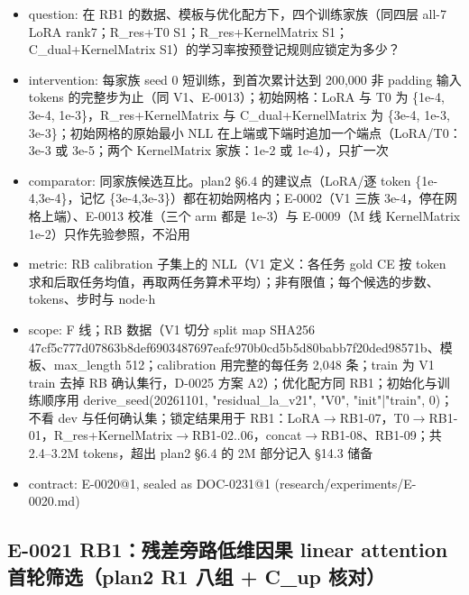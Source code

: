 \documentclass[11pt]{article}
\begin{document}
\begin{itemize}
\item question: 在 RB1 的数据、模板与优化配方下，四个训练家族（同四层 all-7 LoRA rank7；R\_res+T0 S1；R\_res+KernelMatrix S1；C\_dual+KernelMatrix S1）的学习率按预登记规则应锁定为多少？
\item intervention: 每家族 seed 0 短训练，到首次累计达到 200,000 非 padding 输入 tokens 的完整步为止（同 V1、E-0013）；初始网格：LoRA 与 T0 为 \{1e-4, 3e-4, 1e-3\}，R\_res+KernelMatrix 与 C\_dual+KernelMatrix 为 \{3e-4, 1e-3, 3e-3\}；初始网格的原始最小 NLL 在上端或下端时追加一个端点（LoRA/T0：3e-3 或 3e-5；两个 KernelMatrix 家族：1e-2 或 1e-4），只扩一次
\item comparator: 同家族候选互比。plan2 §6.4 的建议点（LoRA/逐 token \{1e-4,3e-4\}，记忆 \{3e-4,3e-3\}）都在初始网格内；E-0002（V1 三族 3e-4，停在网格上端）、E-0013 校准（三个 arm 都是 1e-3）与 E-0009（M 线 KernelMatrix 1e-2）只作先验参照，不沿用
\item metric: RB calibration 子集上的 NLL（V1 定义：各任务 gold CE 按 token 求和后取任务均值，再取两任务算术平均）；非有限值；每个候选的步数、tokens、步时与 node\ensuremath{\cdot}h
\item scope: F 线；RB 数据（V1 切分 split map SHA256 47cf5c777d07863b8def6903487697eafc970b0cd5b5d80babb7f20ded98571b、模板、max\_length 512；calibration 用完整的每任务 2,048 条；train 为 V1 train 去掉 RB 确认集行，D-0025 方案 A2）；优化配方同 RB1；初始化与训练顺序用 derive\_seed(20261101, "residual\_la\_v21", "V0", "init"|"train", 0)；不看 dev 与任何确认集；锁定结果用于 RB1：LoRA\ensuremath{\rightarrow}RB1-07，T0\ensuremath{\rightarrow}RB1-01，R\_res+KernelMatrix\ensuremath{\rightarrow}RB1-02..06，concat\ensuremath{\rightarrow}RB1-08、RB1-09；共 2.4--3.2M tokens，超出 plan2 §6.4 的 2M 部分记入 §14.3 储备
\item contract: E-0020@1, sealed as DOC-0231@1 (research/experiments/E-0020.md)
\end{itemize}

\subsection*{E-0021 RB1：残差旁路低维因果 linear attention 首轮筛选（plan2 R1 八组 + C\_up 核对）}
\end{document}
